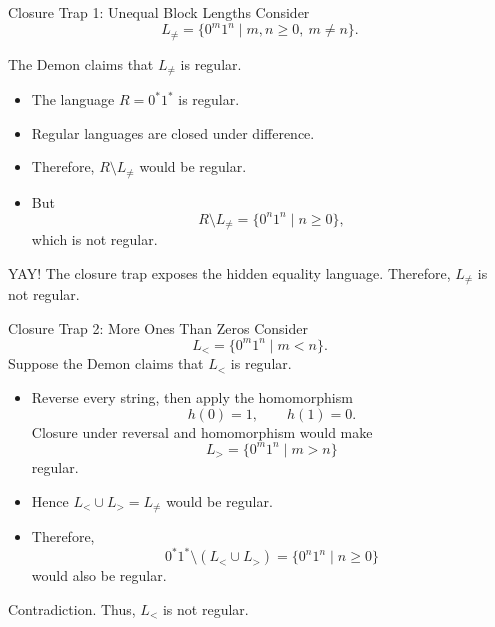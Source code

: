 \documentclass[10pt,aspectratio=169]{beamer}
\begin{document}
\begin{frame}{Closure Trap 1: Unequal Block Lengths}
\small
Consider
\[
L_{\neq}=\{0^m1^n\mid m,n\geq 0,\ m\neq n\}.
\]

The Demon claims that $L_{\neq}$ is regular.

\begin{itemize}
    \item The language $R=0^*1^*$ is regular.
    \item Regular languages are closed under difference.
    \item Therefore, $R\setminus L_{\neq}$ would be regular.
    \item But
    \[
    R\setminus L_{\neq}
    =\{0^n1^n\mid n\geq 0\},
    \]
    which is not regular.
\end{itemize}

\begin{block}{YAY!}
The closure trap exposes the hidden equality language. Therefore,
$L_{\neq}$ is not regular.
\end{block}
\end{frame}

\begin{frame}{Closure Trap 2: More Ones Than Zeros}
\footnotesize
Consider
\[
L_{<}=\{0^m1^n\mid m<n\}.
\]
Suppose the Demon claims that $L_{<}$ is regular.

\begin{itemize}
    \item Reverse every string, then apply the homomorphism
    \[
    h(0)=1,
    \qquad h(1)=0.
    \]
    Closure under reversal and homomorphism would make
    \[
    L_{>}=\{0^m1^n\mid m>n\}
    \]
    regular.
    \item Hence $L_{<}\cup L_{>}=L_{\neq}$ would be regular.
    \item Therefore,
    \[
    0^*1^*\setminus(L_{<}\cup L_{>})
    =\{0^n1^n\mid n\geq 0\}
    \]
    would also be regular.
\end{itemize}

Contradiction. Thus, $L_{<}$ is not regular.
\end{frame}
\end{document}
